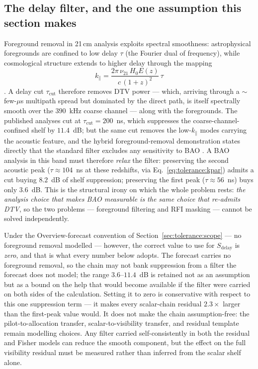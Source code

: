 \subsection*{The delay filter, and the one assumption this section makes}

Foreground removal in 21\,cm analysis exploits spectral smoothness: astrophysical foregrounds are confined to low delay $\tau$ (the Fourier dual of frequency), while cosmological structure extends to higher delay through the mapping
\begin{equation}
\label{eq:tolerance:kpar}
k_\parallel = \frac{2\pi\, \nu_{21}\, H_0 E(z)}{c\, (1+z)^2}\, \tau
\end{equation}
\cite{amiri2023detection}. A delay cut $\tau_{\text{cut}}$ therefore removes DTV power --- which, arriving through a $\sim$few-$\mu$s multipath spread but dominated by the direct path, is itself spectrally smooth over the $390$~kHz coarse channel --- along with the foregrounds. The published analyses cut at $\tau_{\text{cut}} = 200$~ns, which suppresses the coarse-channel-confined shelf by $11.4$~dB; but the same cut removes the low-$k_\parallel$ modes carrying the acoustic feature, and the hybrid foreground-removal demonstration states directly that the standard filter excludes any sensitivity to BAO \cite{chime2024hybrid}. A BAO analysis in this band must therefore \emph{relax} the filter: preserving the second acoustic peak ($\tau \approx 104$~ns at these redshifts, via Eq.~\eqref{eq:tolerance:kpar}) admits a cut buying $8.2$~dB of shelf suppression; preserving the first peak ($\tau \approx 56$~ns) buys only $3.6$~dB. This is the structural irony on which the whole problem rests: \emph{the analysis choice that makes BAO measurable is the same choice that re-admits DTV}, so the two problems --- foreground filtering and RFI masking --- cannot be solved independently.

Under the Overview-forecast convention of Section~\ref{sec:tolerance:scope} --- no foreground removal modelled --- however, the correct value to use for $S_{\text{delay}}$ is \emph{zero}, and that is what every number below adopts. The forecast carries no foreground removal, so the chain may not bank suppression from a filter the forecast does not model; the range $3.6$--$11.4$~dB is retained not as an assumption but as a bound on the help that would become available if the filter were carried on both sides of the calculation. Setting it to zero is conservative with respect to this one suppression term --- it makes every scalar-chain residual $2.3\times$ larger than the first-peak value would.  It does not make the chain assumption-free: the pilot-to-allocation transfer, scalar-to-visibility transfer, and residual template remain modelling choices.  Any filter carried self-consistently in both the residual and Fisher models can reduce the smooth component, but the effect on the full visibility residual must be measured rather than inferred from the scalar shelf alone.

